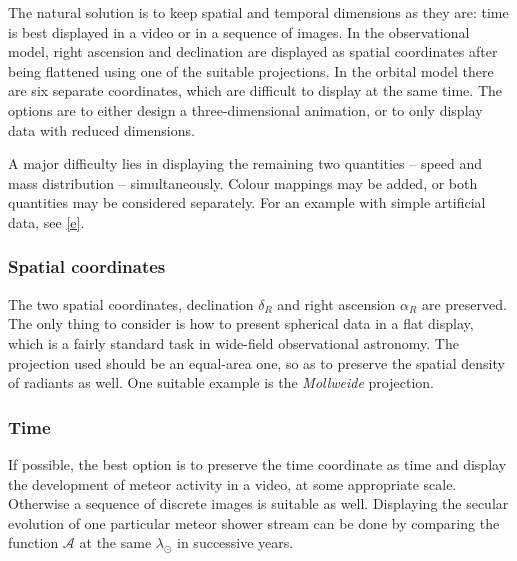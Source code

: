         The natural solution is to keep spatial and temporal dimensions as they are:
        time is best displayed in a video or in a sequence of images.
        In the observational model, right ascension and declination are displayed as spatial coordinates after being
        flattened using one of the suitable projections.
        In the orbital model there are six separate coordinates, which are difficult to display at the same time.
        The options are to either design a three-dimensional animation, or to only display data with reduced dimensions.

        A major difficulty lies in displaying the remaining two quantities -- speed and mass distribution -- simultaneously.
        Colour mappings may be added, or both quantities may be considered separately.
        For an example with simple artificial data, see \cref{e}.

        \subsubsection{Spatial coordinates} \label{iovs}
            The two spatial coordinates, declination $\delta_R$ and right ascension $\alpha_R$ are preserved.
            The only thing to consider is how to present spherical data in a flat display,
            which is a fairly standard task in wide-field observational astronomy.
            The projection used should be an equal-area one, so as to preserve the spatial density of radiants as well.
            One suitable example is the \emph{Mollweide} projection.


        \subsubsection{Time} \label{iovt}
            If possible, the best option is to preserve the time coordinate as time
            and display the development of meteor activity in a video, at some appropriate scale.
            Otherwise a sequence of discrete images is suitable as well.
            Displaying the secular evolution of one particular meteor shower stream can be done
            by comparing the function $\mathcal{A}$ at the same $\lambda_\odot$ in successive years.

